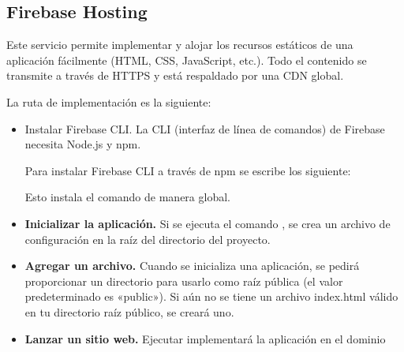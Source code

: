 \subsection*{Firebase Hosting}
\label{\detokenize{firebase_web:firebase-hosting}}

Este servicio permite implementar y alojar los recursos estáticos de una aplicación
fácilmente (HTML, CSS, JavaScript, etc.). Todo el contenido se transmite a través
de HTTPS y está respaldado por una CDN global.

La ruta de implementación es la siguiente:

\begin{itemize}

\item{Instalar Firebase CLI.}
\label{\detokenize{firebase_web:instalar-firebase-cli}}
La CLI (interfaz de línea de comandos) de Firebase necesita Node.js y npm.

Para instalar Firebase CLI a través de npm se escribe los siguiente:

%
\begin{sphinxVerbatim}[commandchars=\\\{\}]
   
\end{sphinxVerbatim}

Esto instala el comando  de manera global.


\item\textbf{Inicializar la aplicación.}
\label{\detokenize{firebase_web:inicializar-la-aplicacion}}
Si se ejecuta el comando , se crea un archivo de configuración
 en la raíz del directorio del proyecto.


\item\textbf{Agregar un archivo.}
\label{\detokenize{firebase_web:agregar-un-archivo}}
Cuando se inicializa una aplicación, se pedirá proporcionar un directorio para
usarlo como raíz pública (el valor predeterminado es «public»). Si aún no
se tiene un archivo index.html válido en tu directorio raíz público, se creará
uno.


\item\textbf{Lanzar un sitio web.}
\label{\detokenize{firebase_web:implementar-un-sitio-web}}
Ejecutar  implementará la aplicación en el dominio

\end{itemize}